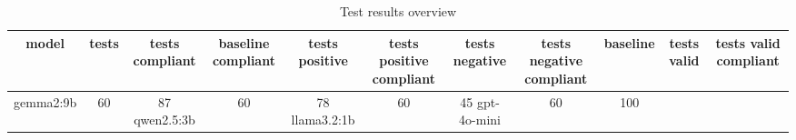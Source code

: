 
  \begin{table}[h!]
  \centering
  \begin{tabular}{|c|c|c|c|c|c|c|c|c|c|c|}
  \hline
  model & tests & tests compliant & baseline compliant & tests positive & tests positive compliant & tests negative & tests negative compliant & baseline & tests valid & tests valid compliant \\
  \hline
  gemma2:9b & 60 & 87%
\hline
qwen2.5:3b & 60 & 78%
\hline
llama3.2:1b & 60 & 45%
\hline
gpt-4o-mini & 60 & 100%
  \end{tabular}
  \caption{Test results overview}
  
  \end{table}
  